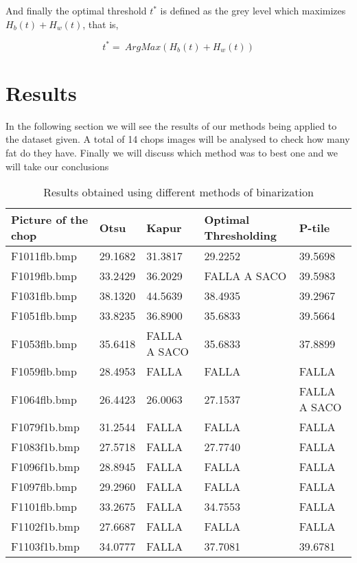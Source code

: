 \documentclass[12]{article}
\begin{document}
And finally the optimal threshold $t^{*}$ is defined as the grey level which maximizes $H_b(t)+H_w(t)$, that is, 
\vspace{-0.5cm}
\begin{center}
$$t^{*}=\ ArgMax\left(H_b(t) + H_w(t)\right)$$
\end{center}
\section{Results}
In the following section we will see the results of our methods being applied to the dataset given. A total of 14 chops images will be analysed to check how many fat do they have.  
Finally we will discuss which method was to best one and we will take our conclusions %
\begin{table}[H]
\centering
\begin{tabular}{|l|l|l|l|l|}
\hline	
Picture of the chop & \textbf{Otsu} & \textbf{Kapur} & \textbf{Optimal Thresholding} & \textbf{P-tile} \\  \hline
 F1011flb.bmp & 29.1682  & 31.3817 & 29.2252  & 39.5698  \\ \hline
  F1019flb.bmp & 33.2429 & 36.2029 & FALLA A SACO & 39.5983 \\  \hline
  F1031flb.bmp & 38.1320 & 44.5639 & 38.4935 & 39.2967  \\ \hline
  F1051flb.bmp & 33.8235 & 36.8900 & 35.6833 & 39.5664\\ \hline
F1053flb.bmp & 35.6418 & FALLA A SACO & 35.6833 & 37.8899\\ \hline
F1059flb.bmp & 28.4953 & FALLA & FALLA & FALLA \\ \hline
F1064flb.bmp & 26.4423 & 26.0063 & 27.1537 & FALLA A SACO\\ \hline
F1079f1b.bmp & 31.2544 & FALLA &  FALLA & FALLA \\ \hline
F1083f1b.bmp & 27.5718 & FALLA & 27.7740  & FALLA \\ \hline
F1096f1b.bmp & 28.8945 & FALLA & FALLA & FALLA \\ \hline
F1097flb.bmp & 29.2960 & FALLA & FALLA & FALLA \\ \hline
F1101flb.bmp & 33.2675 & FALLA & 34.7553 & FALLA \\ \hline
F1102f1b.bmp & 27.6687 &FALLA &FALLA	 & FALLA \\ \hline
F1103f1b.bmp  & 34.0777 & FALLA & 37.7081 & 39.6781\\ \hline
\end{tabular}
\caption{Results obtained using different methods of binarization}
\label{Results}
\end{table}
\end{document}
